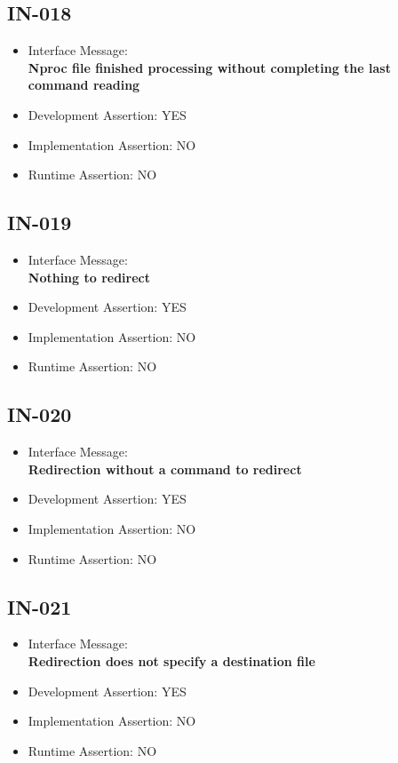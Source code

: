 \subsection{IN-018}
\begin{itemize}
  \item Interface Message:\\[1em]
    \textbf{Nproc file finished processing without completing the last command reading}
  \item Development Assertion: YES
  \item Implementation Assertion: NO
  \item Runtime Assertion: NO
\end{itemize}

\subsection{IN-019}
\begin{itemize}
  \item Interface Message:\\[1em]
    \textbf{Nothing to redirect}
  \item Development Assertion: YES
  \item Implementation Assertion: NO
  \item Runtime Assertion: NO
\end{itemize}

\subsection{IN-020}
\begin{itemize}
  \item Interface Message:\\[1em]
    \textbf{Redirection without a command to redirect}
  \item Development Assertion: YES
  \item Implementation Assertion: NO
  \item Runtime Assertion: NO
\end{itemize}

\subsection{IN-021}
\begin{itemize}
  \item Interface Message:\\[1em]
    \textbf{Redirection does not specify a destination file}
  \item Development Assertion: YES
  \item Implementation Assertion: NO
  \item Runtime Assertion: NO
\end{itemize}

